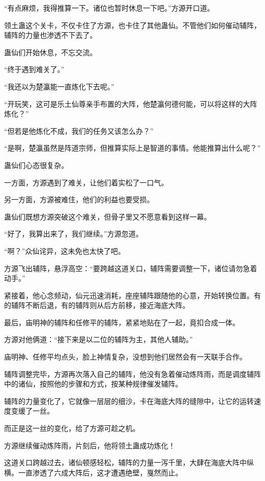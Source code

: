 
\begin{this_body}

“有点麻烦，我得推算一下。诸位也暂时休息一下吧。”方源开口道。

领土蛊这个关卡，不仅卡住了方源，也卡住了其他蛊仙。不管他们如何催动辅阵，辅阵的力量也渗透不下去了。

蛊仙们开始休息，不忘交流。

“终于遇到难关了。”

“我还以为楚瀛能一直炼化下去呢。”

“开玩笑，这可是乐土仙尊亲手布置的大阵，他楚瀛何德何能，可以将这样的大阵炼化？”

“但若是他炼化不成，我们的任务又该怎么办？”

“是啊，楚瀛虽然是阵道宗师，但推算实际上是智道的事情。他能推算出什么呢？”

蛊仙们心态很复杂。

一方面，方源遇到了难关，让他们着实松了一口气。

另一方面，方源被难住，他们的利益也要受损。

蛊仙们既想方源突破这个难关，但骨子里又不愿意看到这样一幕。

“好了，我算出来了，我们继续。”方源忽道。

“啊？”众仙诧异，这未免也太快了吧。

方源飞出辅阵，悬浮高空：“要跨越这道关口，辅阵需要调整一下，诸位请勿急着动手。”

紧接着，他心念频动，仙元迅速消耗，座座辅阵跟随他的心意，开始转换位置。有的辅阵不断后退，有的辅阵则从后方前移，接近海底大阵。

最后，庙明神的辅阵和任修平的辅阵，紧紧地贴在了一起，竟扣合成一体。

方源对他俩道：“接下来是以二位的辅阵为主，其他人辅助。”

庙明神、任修平均点头，脸上神情复杂，没想到他们居然会有一天联手合作。

辅阵调整完毕，方源再次落入自己的辅阵，他没有急着催动炼阵雨，而是调度辅阵中的诸仙，按照他的步骤和方式，按某种规律催发辅阵。

辅阵的力量变化了，它就像一层层的细沙，卡在海底大阵的缝隙中，让它的运转速度变缓了一丝。

而正是这一丝的变化，给了方源可趁之机。

方源继续催动炼阵雨，片刻后，他将领土蛊成功炼化！

这道关口跨越过去，诸仙顿感轻松，辅阵的力量一泻千里，大肆在海底大阵中纵横。一直渗透了六成大阵后，这才遭遇绝壁，戛然而止。


\end{this_body}
